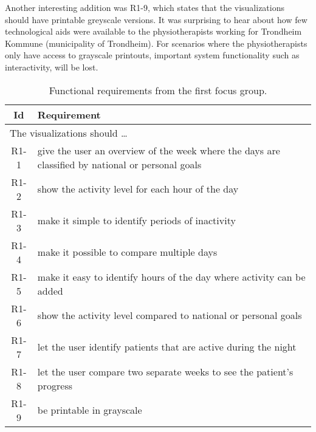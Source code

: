 Another interesting addition was R1-9, which states that the visualizations should have printable greyscale versions. It was surprising to hear about how few technological aids were available to the physiotherapists working for Trondheim Kommune (municipality of Trondheim). For scenarios where the physiotherapists only have access to grayscale printouts, important system functionality such as interactivity, will be lost.

\clearpage

\begin{table}[h!]
  \begin{center}
  \begin{tabular}{|c|p{12cm}|}
    \hline
      \textbf{Id} & \textbf{Requirement} \\ \hline
    \multicolumn{2}{|l|}{The visualizations should \ldots} \\ \hline
      R1-1 & give the user an overview of the week where the days are classified by national or personal goals \\ \hline
      R1-2 & show the activity level for each hour of the day \\ \hline
      R1-3 & make it simple to identify periods of inactivity \\ \hline
      R1-4 & make it possible to compare multiple days \\ \hline
      R1-5 & make it easy to identify hours of the day where activity can be added \\ \hline
      R1-6 & show the activity level compared to national or personal goals \\ \hline
      R1-7 & let the user identify patients that are active during the night \\ \hline
      R1-8 & let the user compare two separate weeks to see the patient's progress \\ \hline
      R1-9 & be printable in grayscale \\ \hline
  \end{tabular}
  \end{center}
  \caption[Functional requirements after the first focus group.]{Functional requirements from the first focus group.}
  \label{tab:f1Req}
\end{table}


